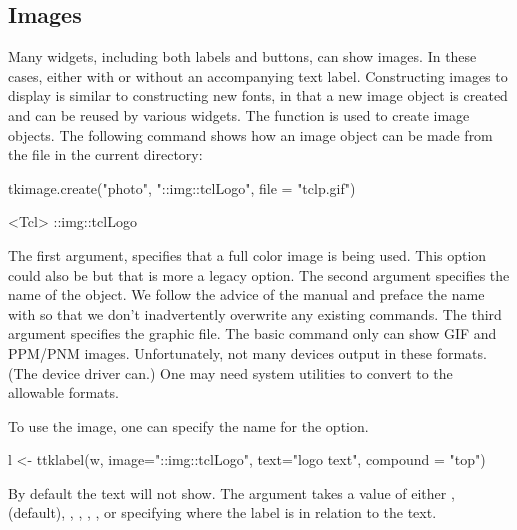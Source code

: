 \subsection{Images}
\label{sec:tcltk:overview:images}


Many  widgets, including both labels and buttons, can show
images. In these cases, either with or without an accompanying text
label. Constructing images to display is similar to constructing new fonts, in
that a new image object is created and can be reused by various
widgets. The  function is used to create image
objects. The following command shows how an image object can be made from the
file  in the current directory:

\begin{Schunk}
\begin{Sinput}
 tkimage.create("photo", "::img::tclLogo", file = "tclp.gif")
\end{Sinput}
\begin{Soutput}
<Tcl> ::img::tclLogo 
\end{Soutput}
\end{Schunk}


The first argument,  specifies that a full color image is
being used. This option could also be  but that is more
a legacy option. The second argument specifies the name of the
object. We follow the advice of the \TK\/ manual and preface the name
with  so that we don't inadvertently overwrite any
existing \TCL\/ commands. The third argument
 specifies the graphic file. The basic
\TK\/  command only can show GIF and PPM/PNM
images. Unfortunately, not many \R\/ devices output in these
formats. (The  device driver can.) One may need system
utilities to convert to the allowable formats.

To use the image, one can specify the name for the  option.
\begin{Schunk}
\begin{Sinput}
 l <- ttklabel(w, image="::img::tclLogo", text="logo text", 
               compound = "top")
\end{Sinput}
\end{Schunk}
By default the text will not show. The  argument takes a value of either ,  (default), , , , , or  specifying where the label is in relation to the text.

